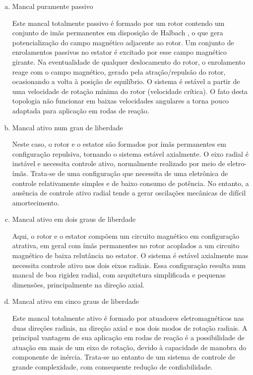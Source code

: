 \begin{enumerate}[a)]
	\item  Mancal puramente passivo
	
	Este mancal totalmente passivo é formado por um rotor contendo um conjunto de imãs permanentes em disposição de Halbach \citep{Detoni2012}, o que gera potencialização do campo magnético adjacente ao rotor. Um conjunto de enrolamentos passivos no estator é excitado por esse campo magnético girante. Na eventualidade de qualquer deslocamento do rotor, o enrolamento reage com o campo magnético, gerado pela atração/repulsão do rotor, ocasionando a volta à posição de equilíbrio. O sistema é estável a partir de uma velocidade de rotação mínima do rotor (velocidade crítica). O fato desta topologia não funcionar em baixas velocidades angulares a torna pouco adaptada para aplicação em rodas de reação.
	
	\item  Mancal ativo num grau de liberdade
	
	Neste caso, o rotor e o estator são formados por ímãs permanentes em configuração repulsiva, tornando o sistema estável axialmente. O eixo radial é instável e necessita controle ativo, normalmente realizado por meio de eletro-ímãs. Trata-se de uma configuração que necessita de uma eletrônica de controle relativamente simples e de baixo consumo de potência. No entanto, a ausência de controle ativo radial tende a gerar oscilações mecânicas de difícil amortecimento.
	
	\item Mancal ativo em dois graus de liberdade
	
	Aqui, o rotor e o estator compõem um circuito magnético em configuração atrativa, em geral com ímãs permanentes no rotor acoplados a um circuito magnético de baixa relutância no estator. O sistema é estável axialmente mas necessita controle ativo nos dois eixos radiais. Essa configuração resulta num mancal de boa rigidez radial, com arquitetura simplificada e pequenas dimensões, principalmente na direção axial.
	
	\item Mancal ativo em cinco graus de liberdade
	
	Este mancal totalmente ativo é formado por atuadores eletromagnéticos nas duas direções radiais, na direção axial e nos dois modos de rotação radiais. A principal vantagem de sua aplicação em rodas de reação é a possibilidade de atuação em mais de um eixo de rotação, devido à capacidade de manobra do componente de inércia. Trata-se no entanto de um sistema de controle de grande complexidade, com consequente redução de confiabilidade. 
\end{enumerate}

